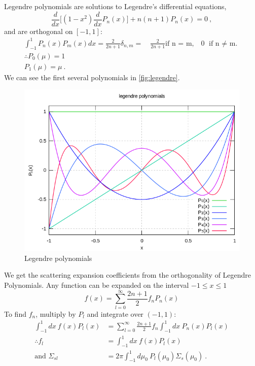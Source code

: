 \documentclass[12pt]{article}
\begin{document}
Legendre polynomials are solutions to Legendre's differential equations,
\[\frac{d}{dx}\bigl[(1 - x^2) \frac{d}{dx} P_n(x) \bigr] + n(n+1)P_n(x) = 0\:,\]
and are orthogonal on $[-1,1]$:
\begin{gather*}
\int_{-1}^{1}P_n(x)P_m(x)dx = 
\frac{2}{2n+1}\delta_{n,m}= \quad\frac{2}{2n+1}\text{if n = m,} \quad 0\text{ if n $\neq$ m.}\\
\therefore P_0(\mu) = 1 \\
P_1(\mu) = \mu\:.
\end{gather*}
%
We can see the first several polynomials in \autoref{fig:legendre}.
\begin{figure}[h!]
    \begin{center}
    \includegraphics[keepaspectratio, width = 3.5 in]{Legendrepolynomials}
    \end{center}
    \caption{Legendre polynomials}
    \label{fig:legendre}
\end{figure}

We get the scattering expansion coefficients from the orthogonality of Legendre Polynomials. Any function can be expanded on the interval $-1 \leq x \leq 1$
\[
f(x) = \sum_{l=0}^{\infty} \frac{2n+1}{2} f_n P_n(x)
\]
To find $f_n$, multiply by $P_l$ and integrate over $(-1,1)$:
\begin{align*}
\int_{-1}^1 dx\: f(x) P_l(x) &= \sum_{l=0}^{\infty} \frac{2n+1}{2} f_n\int_{-1}^1 dx\:  P_n(x) P_l(x)\\
\therefore f_l &= \int_{-1}^1 dx\: f(x) P_l(x)\\
\text{and }\Sigma_{sl} &= 2\pi \int_{-1}^1 d\mu_0 \: P_l(\mu_0)\Sigma_s(\mu_0)\:.
\end{align*}
\end{document}
